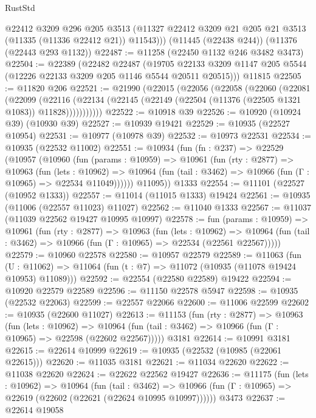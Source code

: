 \begin{lexlean}{RustStd}
\begin{coremodule}
{{{{{{{{{{{{{{{{{{{        @22412
        @3209
        @296
        @205
        @3513
        (@11327 @22412 @3209 @21 @205 @21 @3513 (@11335 (@11336 @22412 @21)) @11543)))
    (@11445 (@22438 @244))
    (@11376 (@22443 @293 @1132))
@22487 := @11258 (@22450 @1132 @246 @3482 @3473)
@22504 := @22389
    (@22482
      @22487
      (@19705 @22133 @3209 @1147 @205 @5544 (@12226 @22133 @3209 @205 @1146 @5544 @20511 @20515)))
    @11815
@22505 := @11820 @206
@22521 := @21990
    (@22015
      (@22056
        (@22058
          (@22060
            (@22081
              (@22099
                (@22116
                  (@22134 (@22145 (@22149 (@22504 (@11376 (@22505 @1321 @1083)) @11828)))))))))))
@22522 := @10918 @39
@22526 := @10920 (@10924 @39) (@10930 @39)
@22527 := @10939 @19421
@22529 := @10935 (@22527 @10954)
@22531 := @10977 (@10978 @39)
@22532 := @10973 @22531
@22534 := @10935 (@22532 @11002)
@22551 := @10934
    (fun (fn : @237) =>
    @22529
      (@10957
        (@10960
          (fun (params : @10959) =>
          @10961
            (fun (rty : @2877) =>
            @10963
              (fun (lets : @10962) =>
              @10964 (fun (tail : @3462) => @10966 (fun (Γ : @10965) => @22534 @11049))))))
        @11095))
    @1333
@22554 := @11101 (@22527 (@10952 @1333))
@22557 := @11014 (@11015 @1333) @19424
@22561 := @10935 (@11006 (@22557 @11023) @11027)
@22562 := @11040 @1333
@22567 := @11037 (@11039 @22562 @19427 @10995 @10997)
@22578 := fun (params : @10959) =>
  @10961
    (fun (rty : @2877) =>
    @10963
      (fun (lets : @10962) =>
      @10964 (fun (tail : @3462) => @10966 (fun (Γ : @10965) => @22534 (@22561 @22567)))))
@22579 := @10960 @22578
@22580 := @10957 @22579
@22589 := @11063
    (fun (U : @11062) => @11064 (fun (t : @7) => @11072 (@10935 (@11078 @19424 @10953) @11089)))
@22592 := @22554 (@22580 @22589) @19422
@22594 := @10920 @22579 @22589
@22596 := @11150 @22578 @5947
@22598 := @10935 (@22532 @22063)
@22599 := @22557 @22066
@22600 := @11006 @22599
@22602 := @10935 (@22600 @11027)
@22613 := @11153
    (fun (rty : @2877) =>
    @10963
      (fun (lets : @10962) =>
      @10964 (fun (tail : @3462) => @10966 (fun (Γ : @10965) => @22598 (@22602 @22567)))))
    @3181
@22614 := @10991 @3181
@22615 := @22614 @10999
@22619 := @10935 (@22532 (@10985 (@22061 @22615)))
@22620 := @11035 @3181
@22621 := @11034 @22620
@22622 := @11038 @22620
@22624 := @22622 @22562 @19427
@22636 := @11175
    (fun (lets : @10962) =>
    @10964
      (fun (tail : @3462) =>
      @10966 (fun (Γ : @10965) => @22619 (@22602 (@22621 (@22624 @10995 @10997))))))
    @3473
@22637 := @22614 @19058
}}}}}}}}}}}}}}}}}}}
\end{coremodule}
\end{lexlean}
